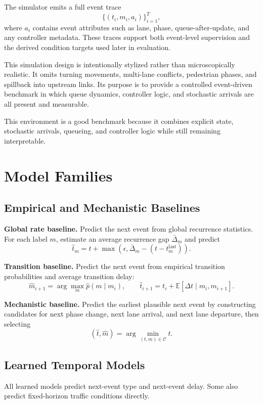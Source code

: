 \documentclass[11pt]{article}
\begin{document}
The simulator emits a full event trace
\[
\{(t_i, m_i, a_i)\}_{i=1}^{T},
\]
where \(a_i\) contains event attributes such as lane, phase, queue-after-update, and any controller metadata. These traces support both event-level supervision and the derived condition targets used later in evaluation.

This simulation design is intentionally stylized rather than microscopically realistic. It omits turning movements, multi-lane conflicts, pedestrian phases, and spillback into upstream links. Its purpose is to provide a controlled event-driven benchmark in which queue dynamics, controller logic, and stochastic arrivals are all present and measurable.

This environment is a good benchmark because it combines explicit state, stochastic arrivals, queueing, and controller logic while still remaining interpretable.

\section{Model Families}

\subsection{Empirical and Mechanistic Baselines}

\textbf{Global rate baseline.} Predict the next event from global recurrence statistics. For each label \(m\), estimate an average recurrence gap \(\bar{\Delta}_m\) and predict
\[
\hat{t}_{m} = t + \max(\epsilon, \bar{\Delta}_m - (t - t_m^{\mathrm{last}})).
\]

\textbf{Transition baseline.} Predict the next event from empirical transition probabilities and average transition delay:
\[
\hat{m}_{i+1} = \arg\max_m \hat{p}(m \mid m_i),
\qquad
\hat{t}_{i+1} = t_i + \mathbb{E}[\Delta t \mid m_i, m_{i+1}].
\]

\textbf{Mechanistic baseline.} Predict the earliest plausible next event by constructing candidates for next phase change, next lane arrival, and next lane departure, then selecting
\[
(\hat{t}, \hat{m}) = \arg\min_{(t,m)\in\mathcal{C}} t.
\]

\subsection{Learned Temporal Models}

All learned models predict next-event type and next-event delay. Some also predict fixed-horizon traffic conditions directly.
\end{document}
